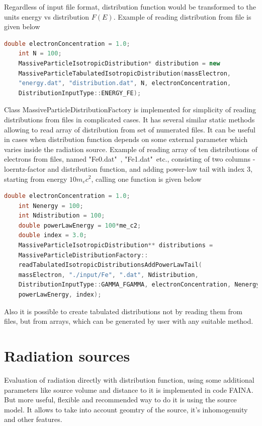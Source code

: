 Regardless of input file format, distribution function would be transformed to the units energy vs distribution $F(E)$. Example of reading distribution from file is given below

\begin{lstlisting}[language=c++]
	double electronConcentration = 1.0;
	int N = 100;
	MassiveParticleIsotropicDistribution* distribution = new
	MassiveParticleTabulatedIsotropicDistribution(massElectron,
	"energy.dat", "distribution.dat", N, electronConcentration,
	DistributionInputType::ENERGY_FE);
\end{lstlisting}

Class MassiveParticleDistributionFactory is implemented for simplicity of reading distributions from files in complicated cases. It has several similar static methods allowing to read array of distribution from set of numerated files. It can be useful in cases when distribution function depends on some external parameter which varies inside the radiation source. Example of reading array of ten distributions of electrons from files, named "Fe0.dat"\ , "Fe1.dat"\ etc., consisting of two columns - loerntz-factor and distribution function, and adding power-law tail with index 3, starting from energy $10 m_e c^2$, calling one function is given below

\begin{lstlisting}[language=c++]
	double electronConcentration = 1.0;
	int Nenergy = 100;
	int Ndistribution = 100;
	double powerLawEnergy = 100*me_c2;
	double index = 3.0;
	MassiveParticleIsotropicDistribution** distributions = 
	MassiveParticleDistributionFactory::
	readTabulatedIsotropicDistributionsAddPowerLawTail(
	massElectron, "./input/Fe", ".dat", Ndistribution, 
	DistributionInputType::GAMMA_FGAMMA, electronConcentration, Nenergy,
	powerLawEnergy, index);
\end{lstlisting}

Also it is possible to create tabulated distributions not by reading them from files, but from arrays, which can be generated by user with any suitable method.

\section{Radiation sources}

Evaluation of radiation directly with distribution function, using some additional parameters like source volume and distance to it is implemented in code FAINA. But more useful, flexible and recommended way to do it is using the source model. It allows to take into account geomtry of the source, it's inhomogenuity and other features.

